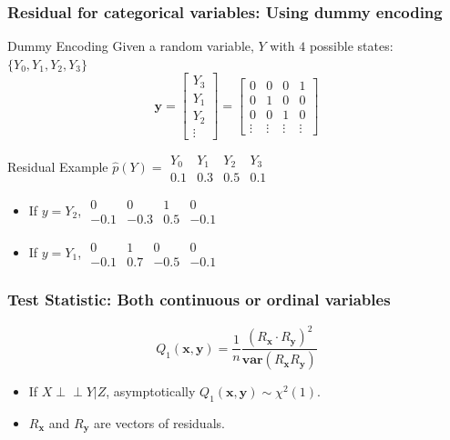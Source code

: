 \documentclass{beamer}
\def\ci{\perp\!\!\!\!\!\perp}
\begin{document}
\begin{frame}
	\frametitle{Residual for categorical variables: Using dummy encoding}
	\begin{block}{Dummy Encoding}
		Given a random variable, $ Y $ with $ 4 $ possible states: $ \{Y_0, Y_1, Y_2, Y_3 \} $
		\begin{equation*}
			\bm{y} = \left[ \begin{array}{c} Y_3 \\ Y_1 \\ Y_2 \\ \vdots \end{array} \right] = \left[ \begin{array}{cccc} 0 & 0 & 0 & 1 \\ 0 & 1 & 0 & 0 \\ 0 & 0 & 1 & 0 \\ \vdots & \vdots & \vdots & \vdots \end{array} \right]
		\end{equation*}
	\end{block}

	\begin{block}{Residual Example}
	$\hat{p}(Y) = \begin{array}{cccc} Y_0 & Y_1 & Y_2 & Y_3 \\ 0.1 & 0.3 & 0.5 & 0.1 \end{array} $
	\begin{itemize}
		\item If $ y = Y_2 $, $ \begin{array}{cccc} 0 & 0 & 1 & 0 \\ -0.1 & -0.3 & 0.5 & -0.1 \end{array} $
		\item If $ y = Y_1 $, $ \begin{array}{cccc} 0 & 1 & 0 & 0 \\ -0.1 & 0.7 & -0.5 & -0.1 \end{array} $
	\end{itemize}
	\end{block}	
\end{frame}

\begin{frame}
	\frametitle{Test Statistic: Both continuous or ordinal variables}
	$$ Q_1(\bm{x}, \bm{y}) = \frac{1}{n} \frac{(R_{\bm{x}} \cdot R_{\bm{y}})^2}{\bm{var}(R_{\bm{x}} R_{\bm{y}})} $$
	\begin{center}
		\begin{itemize}
			\item If $ X \ci Y | Z $, asymptotically $ Q_1(\bm{x}, \bm{y}) \sim \chi^2(1) $.
			\item $ R_{\bm{x}} $ and $ R_{\bm{y}} $ are vectors of residuals.
		\end{itemize}
	\end{center}
\end{frame}
\end{document}

